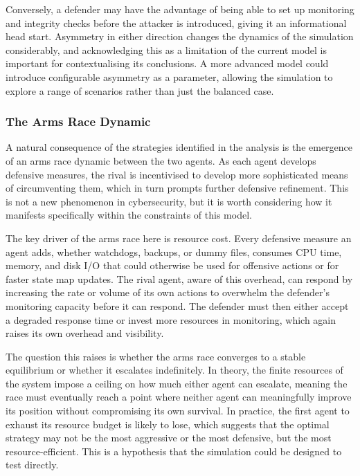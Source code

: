 Conversely, a defender may have the advantage of being able to set up monitoring and integrity checks before the attacker is introduced, giving it an informational head start. Asymmetry in either direction changes the dynamics of the simulation considerably, and acknowledging this as a limitation of the current model is important for contextualising its conclusions. A more advanced model could introduce configurable asymmetry as a parameter, allowing the simulation to explore a range of scenarios rather than just the balanced case.

\subsubsection{The Arms Race Dynamic}
\label{ArmsRaceDynamic}

A natural consequence of the strategies identified in the analysis is the emergence of an arms race dynamic between the two agents. As each agent develops defensive measures, the rival is incentivised to develop more sophisticated means of circumventing them, which in turn prompts further defensive refinement. This is not a new phenomenon in cybersecurity, but it is worth considering how it manifests specifically within the constraints of this model.

The key driver of the arms race here is resource cost. Every defensive measure an agent adds, whether watchdogs, backups, or dummy files, consumes CPU time, memory, and disk I/O that could otherwise be used for offensive actions or for faster state map updates. The rival agent, aware of this overhead, can respond by increasing the rate or volume of its own actions to overwhelm the defender's monitoring capacity before it can respond. The defender must then either accept a degraded response time or invest more resources in monitoring, which again raises its own overhead and visibility.

The question this raises is whether the arms race converges to a stable equilibrium or whether it escalates indefinitely. In theory, the finite resources of the system impose a ceiling on how much either agent can escalate, meaning the race must eventually reach a point where neither agent can meaningfully improve its position without compromising its own survival. In practice, the first agent to exhaust its resource budget is likely to lose, which suggests that the optimal strategy may not be the most aggressive or the most defensive, but the most resource-efficient. This is a hypothesis that the simulation could be designed to test directly.

